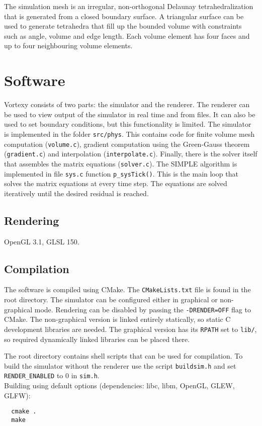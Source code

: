 \documentclass[12pt]{article}
\begin{document}
The simulation mesh is an irregular, non-orthogonal Delaunay tetrahedralization that is generated from a closed boundary surface. A triangular surface can be used to generate tetrahedra that fill up the bounded volume with constraints such as angle, volume and edge length. Each volume element has four faces and up to four neighbouring volume elements.

\section{Software}

Vortexy consists of two parts: the simulator and the renderer. The renderer can be used to view output of the simulator in real time and from files. It can also be used to set boundary conditions, but this functionality is limited. The simulator is implemented in the folder \verb|src/phys|. This contains code for finite volume mesh computation (\verb|volume.c|), gradient computation using the Green-Gauss theorem (\verb|gradient.c|) and interpolation (\verb|interpolate.c|). Finally, there is the solver itself that assembles the matrix equations (\verb|solver.c|). The SIMPLE algorithm is implemented in file \verb|sys.c| function \verb|p_sysTick()|. This is the main loop that solves the matrix equations at every time step. The equations are solved iteratively until the desired residual is reached.

\subsection{Rendering}

OpenGL 3.1, GLSL 150.

\subsection{Compilation}

The software is compiled using CMake. The \verb|CMakeLists.txt| file is found in the root directory. The simulator can be configured either in graphical or non-graphical mode. Rendering can be disabled by passing the \verb|-DRENDER=OFF| flag to CMake. The non-graphical version is linked entirely statically, so static C development libraries are needed. The graphical version has its \verb|RPATH| set to \verb|lib/|, so required dynamically linked libraries can be placed there.

The root directory contains shell scripts that can be used for compilation. To build the simulator without the renderer use the script \verb|buildsim.h| and set \verb|RENDER_ENABLED| to 0 in \verb|sim.h|.\\
Building using default options (dependencies: libc, libm, OpenGL, GLEW, GLFW):
\begin{verbatim}
  cmake .
  make
\end{verbatim}
\end{document}
